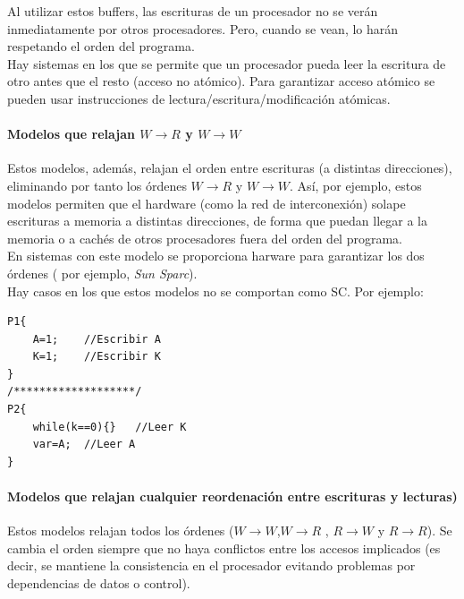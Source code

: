\documentclass[12pt,spanish]{article}
\begin{document}
Al utilizar estos buffers, las escrituras de un procesador no se verán inmediatamente por otros procesadores. Pero, cuando se vean, lo harán respetando el orden del programa.\\

Hay sistemas en los que se permite que un procesador pueda leer la escritura de otro antes que el resto (acceso no atómico). Para garantizar acceso atómico se pueden usar instrucciones de lectura/escritura/modificación atómicas.


\paragraph{Modelos que relajan $W \rightarrow R$ y $W \rightarrow W$\\}

Estos modelos, además, relajan el orden entre escrituras (a distintas direcciones), eliminando por tanto los órdenes $W \rightarrow R$ y $W \rightarrow W$. Así, por ejemplo, estos modelos permiten que el hardware (como la red de interconexión) solape escrituras a memoria a distintas direcciones, de forma que puedan llegar a la memoria o a cachés de otros procesadores fuera del orden del programa.\\

En sistemas con este modelo se proporciona harware para garantizar los dos órdenes ( por ejemplo, \textit{Sun Sparc}).\\

Hay casos en los que estos modelos no se comportan como SC. Por ejemplo:

\begin{verbatim}
P1{
	A=1;	//Escribir A
	K=1;	//Escribir K
}
/*******************/
P2{
	while(k==0){}	//Leer K
	var=A;	//Leer A
}
\end{verbatim}

\paragraph{Modelos que relajan cualquier reordenación entre escrituras y lecturas)\\}

Estos modelos relajan todos los órdenes ($W \rightarrow W$,$W \rightarrow R$ , $R \rightarrow W$ y $R \rightarrow R$). Se cambia el orden siempre que no haya conflictos entre los accesos implicados (es decir, se mantiene la consistencia en el procesador evitando problemas por dependencias de datos o control). \\
\end{document}
